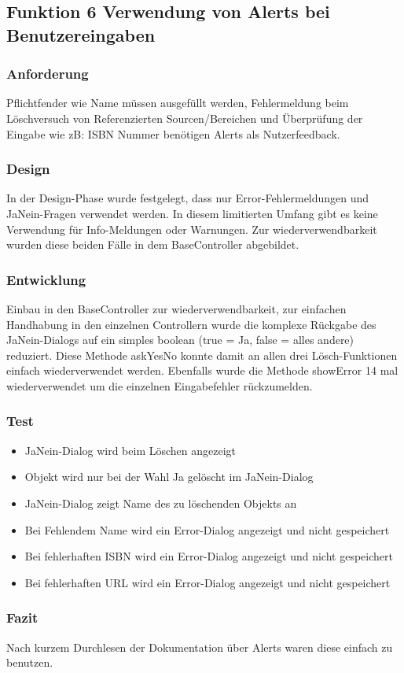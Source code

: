 \subsection[Funktion 6 Alerts]{Funktion 6 Verwendung von Alerts bei Benutzereingaben}

\subsubsection{Anforderung}
Pflichtfender wie Name müssen ausgefüllt werden, Fehlermeldung beim Löschversuch von Referenzierten Sourcen/Bereichen und Überprüfung der Eingabe wie zB: ISBN Nummer benötigen Alerts als Nutzerfeedback.

\subsubsection{Design}
In der Design-Phase wurde festgelegt, dass nur Error-Fehlermeldungen und JaNein-Fragen verwendet werden. In diesem limitierten Umfang gibt es keine Verwendung für Info-Meldungen oder Warnungen. Zur wiederverwendbarkeit wurden diese beiden Fälle in dem BaseController abgebildet.

\subsubsection{Entwicklung}
Einbau in den BaseController zur wiederverwendbarkeit, zur einfachen Handhabung in den einzelnen Controllern wurde die komplexe Rückgabe des JaNein-Dialogs auf ein simples boolean (true = Ja, false = alles andere) reduziert. Diese Methode askYesNo konnte damit an allen drei Lösch-Funktionen einfach wiederverwendet werden. Ebenfalls wurde die Methode showError 14 mal wiederverwendet um die einzelnen Eingabefehler rückzumelden.

\subsubsection{Test}
\begin{itemize}
	\item JaNein-Dialog wird beim Löschen angezeigt
	\item Objekt wird nur bei der Wahl Ja gelöscht im JaNein-Dialog
	\item JaNein-Dialog zeigt Name des zu löschenden Objekts an
	\item Bei Fehlendem Name wird ein Error-Dialog angezeigt und nicht gespeichert
	\item Bei fehlerhaften ISBN wird ein Error-Dialog angezeigt und nicht gespeichert
	\item Bei fehlerhaften URL wird ein Error-Dialog angezeigt und nicht gespeichert
\end{itemize}

\subsubsection{Fazit}
Nach kurzem Durchlesen der Dokumentation über Alerts waren diese einfach zu benutzen.